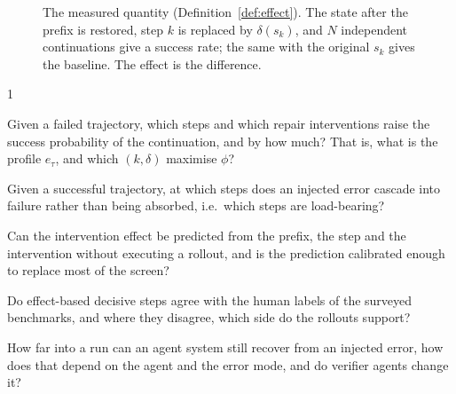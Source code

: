\documentclass[10pt,a4paper]{article}
\begin{document}
\begin{figure}[h]\centering
{}
\caption{The measured quantity (Definition~\ref{def:effect}). The state after the prefix is restored, step $k$ is replaced by $\delta(s_k)$, and $N$ independent continuations give a success rate; the same with the original $s_k$ gives the baseline. The effect is the difference.}
\label{fig:perturb}
\end{figure}

\begin{rqbox}{1}
\begin{description}[leftmargin=3.2em,style=sameline,font=\bfseries,itemsep=1.5pt]
\item[RQ\,1.1] Given a failed trajectory, which steps and which repair interventions raise the success probability of the continuation, and by how much? That is, what is the profile $e_\tau$, and which $(k,\delta)$ maximise $\phi$?
\item[RQ\,1.2] Given a successful trajectory, at which steps does an injected error cascade into failure rather than being absorbed, i.e.\ which steps are load-bearing?
\item[RQ\,1.3] Can the intervention effect be predicted from the prefix, the step and the intervention without executing a rollout, and is the prediction calibrated enough to replace most of the screen?
\item[RQ\,1.4] Do effect-based decisive steps agree with the human labels of the surveyed benchmarks, and where they disagree, which side do the rollouts support?
\item[RQ\,1.5] How far into a run can an agent system still recover from an injected error, how does that depend on the agent and the error mode, and do verifier agents change it?
\end{description}
\end{rqbox}
\end{document}
